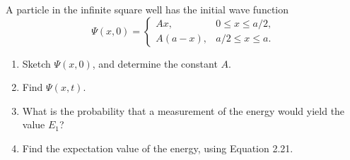 \documentclass[en, oneside]{vivi}
\begin{document}
\begin{prob}
    A particle in the infinite square well has the initial wave function
    \begin{equation*}
        \Psi(x, 0) =
        \begin{cases}
            Ax, & 0 \leq x \leq a/2, \\
            A(a - x), & a/2 \leq x \leq a.
        \end{cases}
    \end{equation*}
    \begin{enumerate}[label=(\alph*)]
        \item Sketch $\Psi(x, 0)$, and determine the constant $A$.
        \item Find $\Psi(x, t)$.
        \item What is the probability that a measurement of the energy would yield the value $E_1$?
        \item Find the expectation value of the energy, using Equation 2.21.
    \end{enumerate}
\end{prob}
\end{document}
